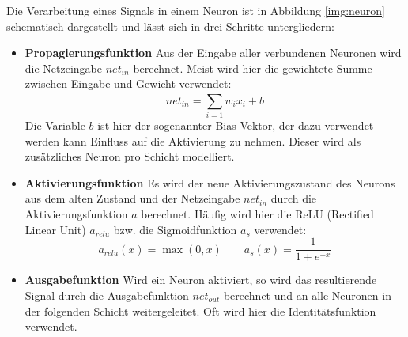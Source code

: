 Die Verarbeitung eines Signals in einem Neuron ist in Abbildung \ref{img:neuron} schematisch dargestellt und lässt sich in drei Schritte untergliedern:
\begin{itemize}
	\item \textbf{Propagierungsfunktion} Aus der Eingabe aller verbundenen Neuronen wird die Netzeingabe $net_{in}$ berechnet. Meist wird hier die gewichtete Summe zwischen Eingabe und Gewicht verwendet: 
	$$net_{in} = \sum_{i=1}^{} w_{i}x_{i} + b$$
Die Variable $b$ ist hier der sogenannter Bias-Vektor, der dazu verwendet werden kann Einfluss auf die Aktivierung zu nehmen. Dieser wird als zusätzliches Neuron pro Schicht modelliert.
	\item \textbf{Aktivierungsfunktion} Es wird der neue Aktivierungszustand des Neurons aus dem alten Zustand und der Netzeingabe $net_{in}$ durch die Aktivierungsfunktion $a$ berechnet. Häufig wird hier die ReLU (Rectified Linear Unit) $a_{relu}$ bzw. die Sigmoidfunktion $a_{s}$ verwendet:
	$$a_{relu}(x) = \max(0,x) \quad \quad a_{s}(x) = \frac1{1+e^{-x}}$$
	\item \textbf{Ausgabefunktion} Wird ein Neuron aktiviert, so wird das resultierende Signal durch die Ausgabefunktion $net_{out}$ berechnet und an alle Neuronen in der folgenden Schicht weitergeleitet. Oft wird hier die Identitätsfunktion verwendet.
\end{itemize}

